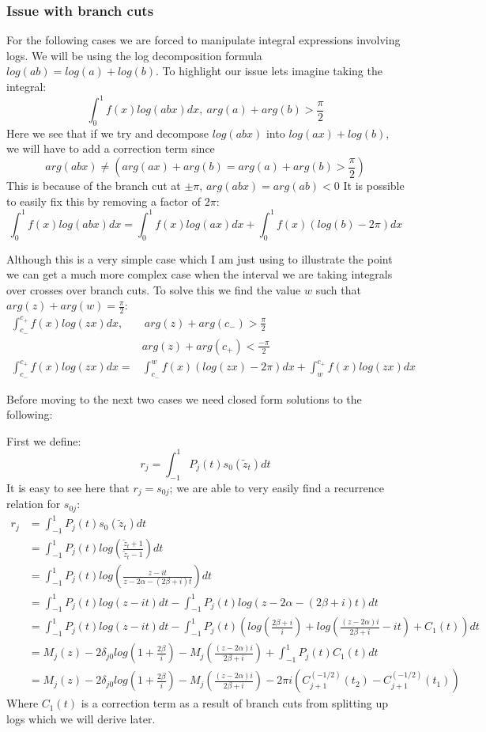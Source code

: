 \documentclass{article}
\begin{document}
\subsubsection*{Issue with branch cuts}
For the following cases we are forced to manipulate integral expressions involving logs.
We will be using the log decomposition formula $log(ab)=log(a)+log(b)$.
To highlight our issue lets imagine taking the integral:
$$\int_{0}^1 f(x)log(abx)dx,\:arg(a)+arg(b)>\frac{\pi}{2}$$
Here we see that if we try and decompose $log(abx)$ into $log(ax)+log(b)$,
we will have to add a correction term since
$$arg(abx)\neq (arg(ax)+arg(b)=arg(a)+arg(b)>\frac{\pi}{2})$$
This is because of the branch cut at $\pm\pi$, $arg(abx)=arg(ab)<0$
It is possible to easily fix this by removing a factor of $2\pi$:
$$\int_{0}^1 f(x)log(abx)dx = \int_{0}^1 f(x)log(ax)dx+\int_{0}^1 f(x)(log(b)-2\pi)dx$$

Although this is a very simple case which I am just using to illustrate the point we can get a much more complex case when the interval we are taking integrals over crosses over branch cuts.
To solve this we find the value $w$ such that $arg(z)+arg(w)=\frac{\pi}{2}$:
\begin{align}
    \int_{c_-}^{c_+}f(x)log(zx)dx,&\:arg(z)+arg(c_-)>\frac{\pi}{2}\\
    &arg(z)+arg(c_+)<\frac{-\pi}{2}\\
    \int_{c_-}^{c_+}f(x)log(zx)dx=&\int_{c_-}^wf(x)(log(zx)-2\pi)dx
    +\int_w^{c_+}f(x)log(zx)dx
\end{align}

Before moving to the next two cases we need closed form solutions to the following:

First we define: $$r_j = \int_{-1}^1P_j(t)s_0(\tilde{z}_t)dt$$
It is easy to see here that $r_j = s_{0j}$; we are able to very easily find a recurrence relation for $s_{0j}$:
\begin{align}
    r_j &= \int_{-1}^1P_j(t)s_0(\tilde{z}_t)dt\\
    &=\int_{-1}^1P_j(t)log(\frac{\tilde{z}_t+1}{\tilde{z}_t-1})dt\\
    &=\int_{-1}^1P_j(t)log(\frac{z-it}{z-2\alpha-(2\beta+i)t})dt\\
    &=\int_{-1}^1P_j(t)log(z-it)dt-\int_{-1}^1P_j(t)log(z-2\alpha-(2\beta+i)t)dt\\
    &=\int_{-1}^1P_j(t)log(z-it)dt
    -\int_{-1}^1P_j(t)(log(\frac{2\beta+i}{i})+log(\frac{(z-2\alpha)i}{2\beta+i}-it)+C_1(t))dt\\
    &=M_j(z)-2\delta_{j0}log(1+\frac{2\beta}{i})-M_j(\frac{(z-2\alpha)i}{2\beta+i})+\int_{-1}^1P_j(t)C_1(t)dt\\
    &=M_j(z)-2\delta_{j0}log(1+\frac{2\beta}{i})-M_j(\frac{(z-2\alpha)i}{2\beta+i})-2\pi i(C_{j+1}^{(-1/2)}(t_2)-C_{j+1}^{(-1/2)}(t_1))
\end{align}
Where $C_1(t)$ is a correction term as a result of branch cuts from splitting up logs which we will derive later.
\end{document}
